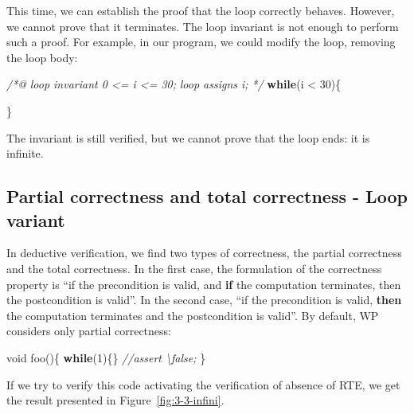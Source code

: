 \documentclass[12pt,francais,]{scrbook}
\newenvironment{Shaded}{}{}
\newcommand{\KeywordTok}[1]{\textcolor[rgb]{0.00,0.44,0.13}{\textbf{{#1}}}}
\newcommand{\DataTypeTok}[1]{\textcolor[rgb]{0.56,0.13,0.00}{{#1}}}
\newcommand{\DecValTok}[1]{\textcolor[rgb]{0.25,0.63,0.44}{{#1}}}
\newcommand{\CommentTok}[1]{\textcolor[rgb]{0.38,0.63,0.69}{\textit{{#1}}}}
\newcommand{\NormalTok}[1]{{#1}}
\begin{document}
This time, we can establish the proof that the loop correctly behaves.
However, we cannot prove that it terminates. The loop invariant is not
enough to perform such a proof. For example, in our program, we could
modify the loop, removing the loop body:

\begin{footnotesize}\begin{Shaded}
\begin{Highlighting}[]
\CommentTok{/*@}
\CommentTok{  loop invariant 0 <= i <= 30;}
\CommentTok{  loop assigns i;}
\CommentTok{*/}
\KeywordTok{while}\NormalTok{(i < }\DecValTok{30}\NormalTok{)\{}
   
\NormalTok{\}}
\end{Highlighting}
\end{Shaded}\end{footnotesize}

The invariant is still verified, but we cannot prove that the loop ends:
it is infinite.

\subsection{Partial correctness and total correctness - Loop
variant}\label{partial-correctness-and-total-correctness---loop-variant}

In deductive verification, we find two types of correctness, the partial
correctness and the total correctness. In the first case, the
formulation of the correctness property is ``if the precondition is
valid, and \textbf{if} the computation terminates, then the
postcondition is valid''. In the second case, ``if the precondition is
valid, \textbf{then} the computation terminates and the postcondition is
valid''. By default, WP considers only partial correctness:

\begin{footnotesize}\begin{Shaded}
\begin{Highlighting}[]
\DataTypeTok{void} \NormalTok{foo()\{}
  \KeywordTok{while}\NormalTok{(}\DecValTok{1}\NormalTok{)\{\}}
  \CommentTok{//assert \textbackslash{}false;}
\NormalTok{\}}
\end{Highlighting}
\end{Shaded}\end{footnotesize}

If we try to verify this code activating the verification of absence of
RTE, we get the result presented in Figure~\ref{fig:3-3-infini}.
\end{document}

